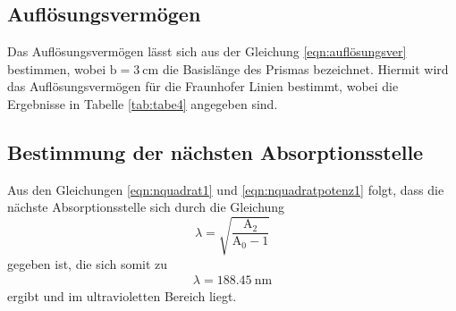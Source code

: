 \subsection{Auflösungsvermögen}
Das Auflösungsvermögen lässt sich aus der Gleichung \ref{eqn:auflösungsver}
bestimmen, wobei $\text{b}=\SI{3}{\centi\meter}$ die Basislänge des Prismas
bezeichnet.
Hiermit wird das Auflösungsvermögen für die Fraunhofer Linien bestimmt, wobei die
Ergebnisse in Tabelle \ref{tab:tabe4} angegeben sind.


\subsection{Bestimmung der nächsten Absorptionsstelle}
Aus den Gleichungen \ref{eqn:nquadrat1} und \ref{eqn:nquadratpotenz1} folgt, dass die nächste Absorptionsstelle sich durch die
Gleichung
\begin{equation}
  \lambda = \sqrt{\frac{\text{A}_2}{\text{A}_0-1}}
\end{equation}
gegeben ist, die sich somit zu
\begin{align*}
    \lambda = \SI{188.45}{\nano\meter}
\end{align*}
ergibt und im ultravioletten Bereich liegt.
